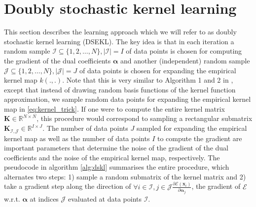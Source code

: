 \documentclass{article} %
\newcommand{\R}{\ensuremath{\mathds{R}}}
\newcommand{\va}{\boldsymbol{\alpha}}
\renewcommand{\vec}[1]{\mathbf{#1}}
\begin{document}
\section{Doubly stochastic kernel learning}\label{sec:dskl}
This section describes the learning approach which we will refer to as doubly stochastic kernel learning (DSEKL). The key idea is that in each iteration a random sample $\mathcal{I}\subseteq\{1,2,\dots,N\}, |\mathcal{I}|=I$ of data points is chosen for computing the gradient of the dual coefficients $\va$ and another (independent) random sample  $\mathcal{J}\subseteq\{1,2,\dots,N\}, |\mathcal{J}|=J$ of data points is chosen for expanding the empirical kernel map $k(.,.)$. Note that this is very similar to Algorithm 1 and 2 in \cite{Dai2014}, except that instead of drawing random basis functions of the kernel function approximation, we sample random data points for expanding the empirical kernel map in \autoref{eq:kernel_trick}. If one were to compute the entire kernel matrix $\vec{K}\in\R^{N\times N}$, this procedure would correspond to sampling a rectangular submatrix $\vec{K}_{\mathcal{I,J}}\in\R^{I\times J}$. The number of data points $J$ sampled for expanding the empirical kernel map as well as the number of data points $I$ to compute the gradient are important parameters that determine the noise of the gradient of the dual coefficients and the noise of the empirical kernel map, respectively. The pseudocode in algorithm \autoref{alg:dskl} summarises the entire procedure, which alternates two steps: 1) sample a random submatrix of the kernel matrix and 2) take a gradient step along the direction of $\forall i\in \mathcal{I}, j\in\mathcal{J} \frac{\partial\mathcal{E}(\vec{x}_i)}{\partial \va_{j}}$, the gradient of $\mathcal{E}$ w.r.t. $\va$ at indices $\mathcal{J}$ evaluated at data points $\mathcal{I}$.
\end{document}
